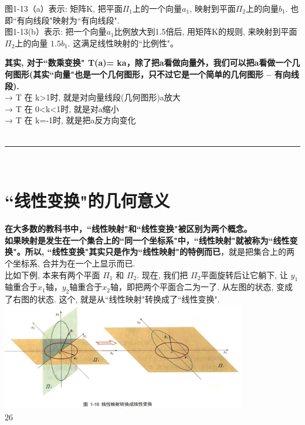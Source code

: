 \documentclass[UTF8]{ctexart}
\begin{document}
\begin{myEnvSample}
图1-13（a）表示: 矩阵K, 把平面$\varPi _1$上的一个向量$a_1$, 映射到平面$\varPi _2$上的向量$b_1$. 也即``有向线段"映射为``有向线段". \\
图1-13(b）表示: 把一个向量$a_1$比例放大到1.5倍后, 用矩阵K的规则, 来映射到平面$\varPi _2$上的向量 $1.5b_1$. 这满足线性映射的``比例性"。\\
\end{myEnvSample}


\textbf{其实, 对于``数乘变换" T(a)= ka，除了把a看做向量外，我们可以把a看做一个几何图形(其实``向量"也是一个几何图形，只不过它是一个简单的几何图形 -- 有向线段).}\\
→ T 在 k>1时, 就是对向量线段(几何图形)a放大 \\
→ T 在 0<k<1时, 就是对a缩小 \\
→ T 在 k=-1时, 就是把a反方向变化 \\

~\\
\hrule
~\\


\section{``线性变换"的几何意义}

\textbf{在大多数的教科书中，``线性映射"和``线性变换"被区别为两个概念。\\
如果映射是发生在一个集合上的``同一个坐标系"中，``线性映射"就被称为``线性变换"。所以, ``线性变换"其实只是作为``线性映射"的特例而已}，就是把集合上的两个坐标系, 合并为在一个上显示而已. \\

比如下例, 本来有两个平面 $\varPi_1$ 和 $\varPi_2$. 现在, 我们把 $\varPi_2$平面旋转后让它躺下,  让 $y_1$轴重合于$x_1$轴，$y_2$轴重合于$x_2$轴，即把两个平面合二为一了. 从左图的状态, 变成了右图的状态. 这个, 就是从``线性映射"转换成了``线性变换".\\

\includegraphics[width=0.8\textwidth]{img/0121.png}\\







26
\end{document}
